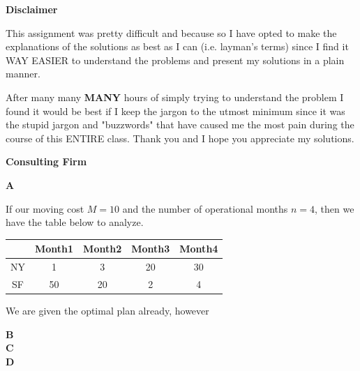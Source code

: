\documentclass[11pt]{article}
\begin{document}
	

{\selectfont 

	\begin{center}
		\Large \textbf{Disclaimer} \\
	\end{center}
	
	\normalsize This assignment was pretty difficult and because so I have opted to make the explanations of the solutions as best as I can (i.e. layman's terms) since I find it WAY EASIER to understand the problems and present my solutions in a plain manner.
	
		\hfil
		
	After many many \textbf{MANY} hours of simply trying to understand the problem I found it would be best if I keep the jargon to the utmost minimum since it was the stupid jargon and "buzzwords" that have caused me the most pain during the course of this ENTIRE class. Thank you and I hope you appreciate my solutions. 
}


\medskip


\lineacross


\begin{solution} \textbf{Consulting Firm} \\

	\hfil
	
	\textbf{A}\\
	
	\hfil
	
	If our moving cost $M = 10$ and the number of operational months $n = 4$, then we have the table below to analyze.
		
		
	\begin{center}
		\begin{tabular}{ | c | c | c | c | c |}
			 \hline  
			 & Month1 & Month2 & Month3 & Month4 \\
			\hline
 			NY & 1 & 3 	& 20 & 30\\ 
 			\hline
 			SF & 50 & 20 & 2 & 4\\  
 			\hline  
		\end{tabular}
	\end{center}
	
	We are given the optimal plan already, however
	 
	\textbf{B}\\
	
	\textbf{C}\\
	
	\textbf{D}\\
\end{solution}
\end{document}
